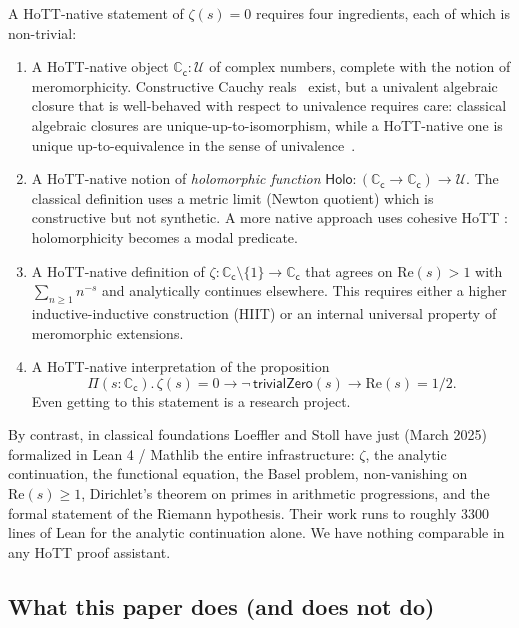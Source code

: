 \documentclass[12pt]{article}
\theoremstyle{definition}
\theoremstyle{remark}
\newcommand{\C}{\mathbb{C}}
\newcommand{\Type}{\mathcal{U}}
\newcommand{\Cc}{\C_{\mathsf{c}}}
\newcommand{\holo}{\mathsf{Holo}}
\begin{document}
A HoTT-native statement of $\zeta(s)=0$ requires four ingredients, each of
which is non-trivial:
\begin{enumerate}
\item A HoTT-native object $\Cc:\Type$ of complex numbers, complete with the
notion of meromorphicity. Constructive Cauchy reals~\cite{HoTTBook,Booij2020}
exist, but a univalent algebraic closure that is well-behaved with respect
to univalence requires care: classical algebraic closures are
unique-up-to-isomorphism, while a HoTT-native one is unique up-to-equivalence
in the sense of univalence~\cite{Voevodsky2014}.
\item A HoTT-native notion of \emph{holomorphic function} $\holo:(\Cc \to \Cc) \to \Type$.
The classical definition uses a metric limit (Newton quotient) which is
constructive but not synthetic. A more native approach uses cohesive HoTT
\cite{Shulman2018Cohesive}: holomorphicity becomes a modal predicate.
\item A HoTT-native definition of $\zeta:\Cc \setminus \{1\} \to \Cc$ that
agrees on $\mathrm{Re}(s)>1$ with $\sum_{n\geq 1} n^{-s}$ and analytically
continues elsewhere. This requires either a higher inductive-inductive
construction (HIIT) or an internal universal property of meromorphic
extensions.
\item A HoTT-native interpretation of the proposition
\[
\Pi(s:\Cc).\, \zeta(s) = 0 \to \neg\,\mathsf{trivialZero}(s) \to \mathrm{Re}(s) = 1/2.
\]
Even getting to this statement is a research project.
\end{enumerate}

By contrast, in classical foundations Loeffler and Stoll
\cite{LoefflerStoll2025} have just (March 2025) formalized in Lean 4 /
Mathlib the entire infrastructure: $\zeta$, the analytic continuation, the
functional equation, the Basel problem, non-vanishing on $\mathrm{Re}(s) \geq 1$,
Dirichlet's theorem on primes in arithmetic progressions, and the formal
statement of the Riemann hypothesis. Their work runs to roughly 3300 lines
of Lean for the analytic continuation alone. We have nothing comparable in
any HoTT proof assistant.

\subsection{What this paper does (and does not do)}
\end{document}
